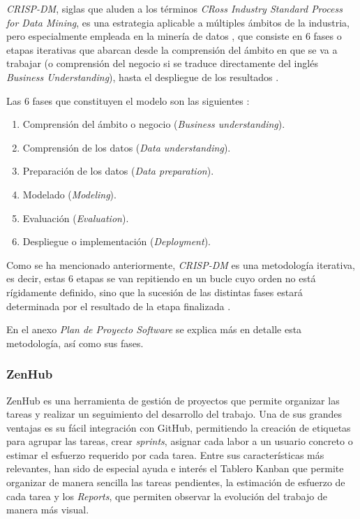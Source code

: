 \textit{CRISP-DM}, siglas que aluden a los términos \textit{CRoss Industry Standard Process for Data Mining}, es una estrategia aplicable a múltiples ámbitos de la industria, pero especialmente empleada en la minería de datos \cite{crispdm:azevedo}, que consiste en 6 fases o etapas iterativas que abarcan desde la comprensión del ámbito en que se va a trabajar (o comprensión del negocio si se traduce directamente del inglés \textit{Business Understanding}), hasta el despliegue de los resultados \cite{crispdm:niaksu,crispdm:schorer}.

Las 6 fases que constituyen el modelo son las siguientes \cite{crispdm:niaksu,crispdm:schorer}:
\begin{enumerate}[itemsep=0.1em]
    \item Comprensión del ámbito o negocio (\textit{Business understanding}).
    \item Comprensión de los datos (\textit{Data understanding}).
    \item Preparación de los datos (\textit{Data preparation}).
    \item Modelado (\textit{Modeling}).
    \item Evaluación (\textit{Evaluation}).
    \item Despliegue o implementación (\textit{Deployment}).
\end{enumerate}

Como se ha mencionado anteriormente, \textit{CRISP-DM} es una metodología iterativa, es decir, estas 6 etapas se van repitiendo en un bucle cuyo orden no está rígidamente definido, sino que la sucesión de las distintas fases estará determinada por el resultado de la etapa finalizada \cite{crispdm:niaksu}.

En el anexo \textit{Plan de Proyecto Software} se explica más en detalle esta metodología, así como sus fases.

\subsubsection{ZenHub}

ZenHub es una herramienta de gestión de proyectos que permite organizar las tareas y realizar un seguimiento del desarrollo del trabajo. Una de sus grandes ventajas es su fácil integración con GitHub, permitiendo la creación de etiquetas para agrupar las tareas, crear \textit{sprints}, asignar cada labor a un usuario concreto o estimar el esfuerzo requerido por cada tarea. Entre sus características más relevantes, han sido de especial ayuda e interés el Tablero Kanban que permite organizar de manera sencilla las tareas pendientes, la estimación de esfuerzo de cada tarea y los \textit{Reports}, que permiten observar la evolución del trabajo de manera más visual.

